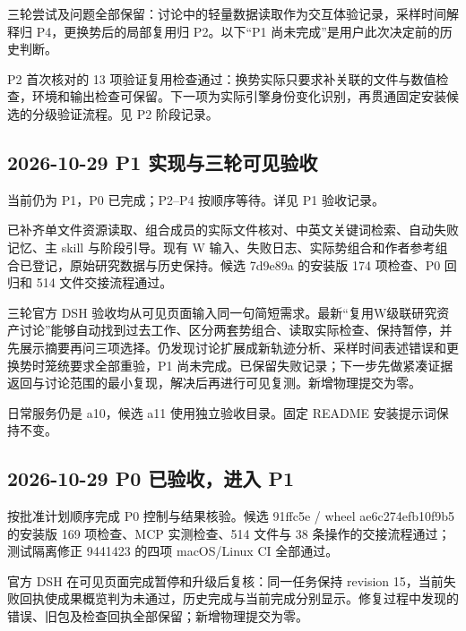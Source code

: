 \documentclass[11pt,a4paper]{ctexart}
\begin{document}
三轮尝试及问题全部保留：讨论中的轻量数据读取作为交互体验记录，采样时间解释归 P4，更换势后的局部复用归 P2。以下“P1 尚未完成”是用户此次决定前的历史判断。



P2 首次核对的 13 项验证复用检查通过：换势实际只要求补关联的文件与数值检查，环境和输出检查可保留。下一项为实际引擎身份变化识别，再贯通固定安装候选的分级验证流程。见 P2 阶段记录。



\subsection{2026-10-29 P1 实现与三轮可见验收}


当前仍为 P1，P0 已完成；P2–P4 按顺序等待。详见 P1 验收记录。



已补齐单文件资源读取、组合成员的实际文件核对、中英文关键词检索、自动失败记忆、主 skill 与阶段引导。现有 W 输入、失败日志、实际势组合和作者参考组合已登记，原始研究数据与历史保持。候选 7d9e89a 的安装版 174 项检查、P0 回归和 514 文件交接流程通过。



三轮官方 DSH 验收均从可见页面输入同一句简短需求。最新“复用W级联研究资产讨论”能够自动找到过去工作、区分两套势组合、读取实际检查、保持暂停，并先展示摘要再问三项选择。仍发现讨论扩展成新轨迹分析、采样时间表述错误和更换势时笼统要求全部重验，P1 尚未完成。已保留失败记录；下一步先做紧凑证据返回与讨论范围的最小复现，解决后再进行可见复测。新增物理提交为零。



日常服务仍是 a10，候选 a11 使用独立验收目录。固定 README 安装提示词保持不变。



\subsection{2026-10-29 P0 已验收，进入 P1}


按批准计划顺序完成 P0 控制与结果核验。候选 91ffc5e /\allowbreak{} wheel ae6c274efb10f9b5 的安装版 169 项检查、MCP 实测检查、514 文件与 38 条操作的交接流程通过；测试隔离修正 9441423 的四项 macOS/\allowbreak{}Linux CI 全部通过。



官方 DSH 在可见页面完成暂停和升级后复核：同一任务保持 revision 15，当前失败回执使成果概览判为未通过，历史完成与当前完成分别显示。修复过程中发现的错误、旧包及检查回执全部保留；新增物理提交为零。
\end{document}
